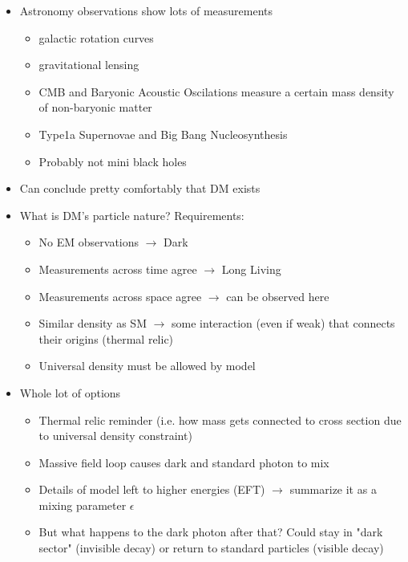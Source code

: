 \begin{itemize}
    \item Astronomy observations show lots of measurements
          \begin{itemize}
              \item galactic rotation curves \cite{rubin-rotationcurve-1980,rotationcurve-2000}
              \item gravitational lensing \cite{gravlensing-2004}
              \item CMB and Baryonic Acoustic Oscilations measure a certain mass density of non-baryonic matter
              \item Type1a Supernovae \cite{type1a-supernova-2010} and Big Bang Nucleosynthesis \cite{nucleosynthesis-1998}
              \item Probably not mini black holes \cite{constraints-primordial-black-holes-2021}
          \end{itemize}
    \item Can conclude pretty comfortably that DM exists
    \item What is DM's particle nature? Requirements:
          \begin{itemize}
              \item No EM observations $\rightarrow$ Dark
              \item Measurements across time agree $\rightarrow$ Long Living
              \item Measurements across space agree $\rightarrow$ can be observed here
              \item Similar density as SM $\rightarrow$ some interaction (even if weak) that connects their origins (thermal relic)
              \item Universal density must be allowed by model
          \end{itemize}
    \item Whole lot of options
          \begin{itemize}
              \item Thermal relic reminder (i.e. how mass gets connected to cross section due to universal density constraint) \cite{thermal-freezeout-diagram-1996}
              \item Massive field loop causes dark and standard photon to mix
              \item Details of model left to higher energies (EFT) $\rightarrow$ summarize it as a mixing parameter $\epsilon$ \cite{kinetic-mixing-1986}
              \item But what happens to the dark photon after that? Could stay in "dark sector" (invisible decay) or return to standard particles (visible decay)

\end{itemize}
\end{itemize}

